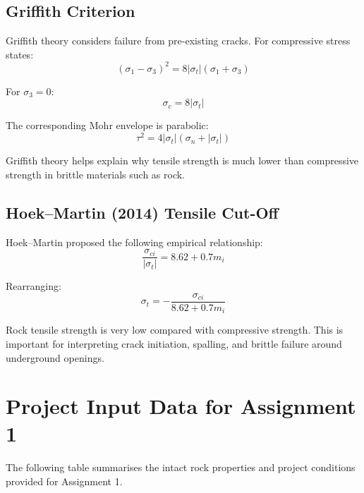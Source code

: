 \documentclass[a4paper,12pt]{article}
\begin{document}
\subsection{Griffith Criterion}

Griffith theory considers failure from pre-existing cracks. For compressive stress states:
\[
(\sigma_1-\sigma_3)^2 =
8|\sigma_t|(\sigma_1+\sigma_3)
\]

For \(\sigma_3=0\):
\[
\sigma_c = 8|\sigma_t|
\]

The corresponding Mohr envelope is parabolic:
\[
\tau^2 =
4|\sigma_t|(\sigma_n+|\sigma_t|)
\]

\begin{notebox}
Griffith theory helps explain why tensile strength is much lower than compressive strength
in brittle materials such as rock.
\end{notebox}

\subsection{Hoek--Martin (2014) Tensile Cut-Off}

Hoek--Martin proposed the following empirical relationship:
\[
\frac{\sigma_{ci}}{|\sigma_t|}
=
8.62 + 0.7m_i
\]

Rearranging:
\[
\sigma_t =
-\frac{\sigma_{ci}}{8.62+0.7m_i}
\]

\begin{warnbox}
Rock tensile strength is very low compared with compressive strength. This is important
for interpreting crack initiation, spalling, and brittle failure around underground openings.
\end{warnbox}

\section{Project Input Data for Assignment 1}

The following table summarises the intact rock properties and project conditions provided
for Assignment 1.
\end{document}

